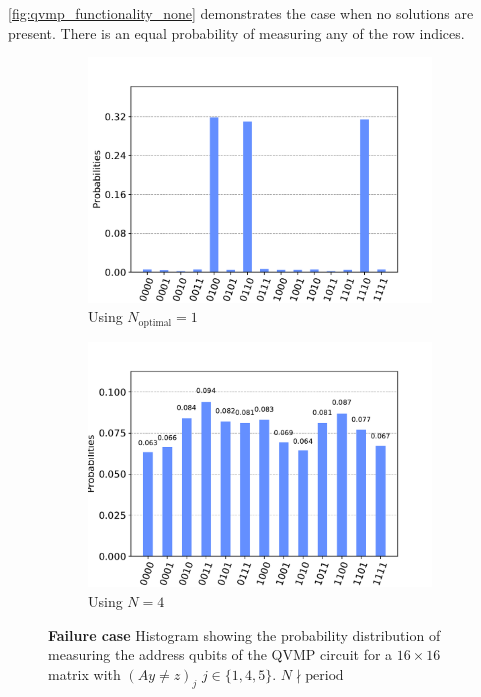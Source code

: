 \documentclass[11pt]{article}
\theoremstyle{definition}
\theoremstyle{remark}
\begin{document}
\cref{fig:qvmp_functionality_none} demonstrates the case when no solutions are
present. There is an equal probability of measuring any of the row indices.

\begin{figure}[h!]
  \centering
  \begin{subfigure}{0.48\textwidth}
    \centering
    \includegraphics[width=\textwidth]{../results/figures/qvmp_functionality_pfound_known__1.pdf}
    \caption{Using $N_{\text{optimal}} = 1$}
  \end{subfigure}
  \begin{subfigure}{0.48\textwidth}
    \centering
    \includegraphics[width=\textwidth]{../results/figures/qvmp_functionality_pfound_unknown__1.pdf}
    \caption{Using $N = 4$}
  \end{subfigure}
  \caption{\textbf{Failure case} Histogram showing the probability distribution
  of measuring the address qubits of the QVMP circuit for a $16 \times 16$
  matrix with $(Ay \neq z)_j$ $j \in \{1, 4, 5\}$. $N \nmid \text{period}$}
  \label{fig:qvmp_functionality_pfound_unknown__1}
\end{figure}
\end{document}
